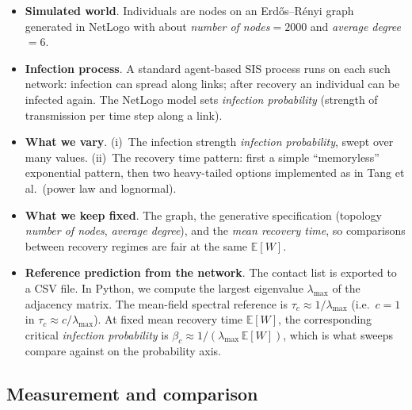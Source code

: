 \documentclass[11pt,a4paper]{article}
\begin{document}
\begin{itemize}[leftmargin=*]
  \item \textbf{Simulated world}. Individuals are nodes on an Erd\H{o}s--R\'enyi graph~\cite{ErdosRenyi1959} generated in NetLogo with about \emph{number of nodes}${}=2000$ and \emph{average degree}${}=6$. 

  \item \textbf{Infection process}. A standard agent-based SIS process runs on each such network: infection can spread along links; after recovery an individual can be infected again. The NetLogo model sets \emph{infection probability} (strength of transmission per time step along a link).

  \item \textbf{What we vary}. (i)~The infection strength \emph{infection probability}, swept over many values. (ii)~The recovery time pattern: first a simple ``memoryless'' exponential pattern, then two heavy-tailed options implemented as in Tang et al.\ (power law and lognormal).

  \item \textbf{What we keep fixed}. The graph, the generative specification (topology \emph{number of nodes}, \emph{average degree}), and the \emph{mean recovery time}, so comparisons between recovery regimes are fair at the same $\mathbb{E}[W]$.

  \item \textbf{Reference prediction from the network}. The contact list is exported to a CSV file. In Python, we compute the largest eigenvalue $\lambda_{\max}$ of the adjacency matrix. The mean-field spectral reference is $\tau_c \approx 1/\lambda_{\max}$ (i.e.\ $c=1$ in $\tau_c \approx c/\lambda_{\max}$). At fixed mean recovery time $\mathbb{E}[W]$, the corresponding critical \emph{infection probability} is $\beta_c \approx 1/(\lambda_{\max}\,\mathbb{E}[W])$, which is what sweeps compare against on the probability axis.
\end{itemize}

\subsection*{Measurement and comparison}
\end{document}
